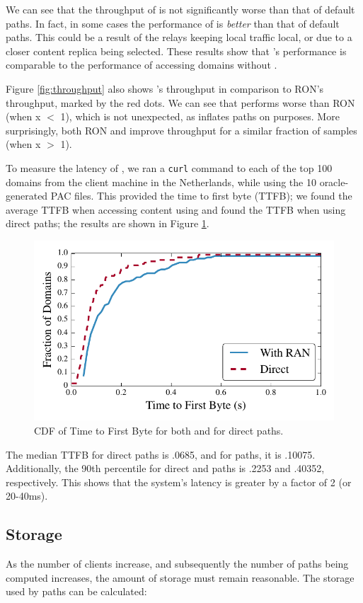 We can see that the throughput of \system{} is not significantly worse than that 
of default paths.  In fact, in some cases the performance of \system{} is {\it 
better} than that of default paths.  This could be a result of the relays 
keeping local traffic local, or due to a closer content replica being selected. 
These results show that \system{}'s performance is comparable to the performance 
of accessing domains without \system{}.

Figure \ref{fig:throughput} also shows \system{}'s throughput in comparison to 
RON's throughput, marked by the red dots.  We can see that \system{} performs 
worse than RON (when x $<$ 1), which is not unexpected, as \system{} inflates 
paths on purposes.  More surprisingly, both RON and \system{} improve throughput 
for a similar fraction of samples (when x $>$ 1).

To measure the latency of \system{}, we ran a {\tt curl} command to each of the 
top 100 domains from the client machine in the Netherlands, while using the 10
oracle-generated PAC files. This provided the time to first byte (TTFB); we 
found the average TTFB when accessing content using \system{} and 
found the TTFB when using direct paths; the results are shown in Figure \ref{fig:latency}.  

\begin{figure}[t]
\centering
\includegraphics[width=.5\textwidth]{latency}
\caption{CDF of Time to First Byte for both \system{} and for direct paths.}
\label{fig:latency}
\end{figure}

The median TTFB for direct paths is .0685, and for \system{} paths, it is .10075.  Additionally, 
the 90th percentile for direct and \system{} paths is .2253 and .40352, respectively.  This 
shows that the system's latency is greater by a factor of 2 (or 20-40ms).  

\subsection{Storage}
As the number of clients increase, and subsequently the number of paths being 
computed increases, the amount of storage must remain reasonable.  The storage 
used by paths can be calculated:

